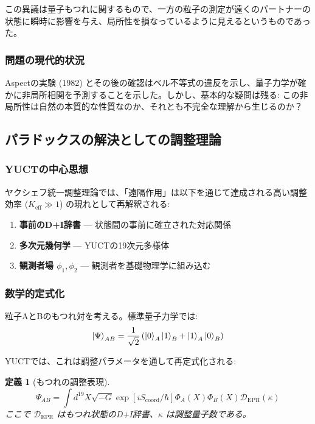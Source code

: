 \documentclass[11pt,a4paper]{article}
\newtheorem{definition}{定義}
\begin{document}
	この異議は量子もつれに関するもので、一方の粒子の測定が遠くのパートナーの状態に瞬時に影響を与え、局所性を損なっているように見えるというものであった。
	
	\subsubsection{問題の現代的状況}
	Aspectの実験 (1982) とその後の確認はベル不等式の違反を示し、量子力学が確かに非局所相関を予測することを示した。しかし、基本的な疑問は残る: この非局所性は自然の本質的な性質なのか、それとも不完全な理解から生じるのか？
	
	\subsection{パラドックスの解決としての調整理論}
	\label{subsec:yuct-solution}
	
	\subsubsection{YUCTの中心思想}
	ヤクシェフ統一調整理論では、「遠隔作用」は以下を通じて達成される高い調整効率 ($K_{\mathrm{eff}} \gg 1$) の現れとして再解釈される:
	
	\begin{enumerate}
		\item \textbf{事前のD+I辞書} — 状態間の事前に確立された対応関係
		\item \textbf{多次元幾何学} — YUCTの19次元多様体
		\item \textbf{観測者場 $\phi_1, \phi_2$} — 観測者を基礎物理学に組み込む
	\end{enumerate}
	
	\subsubsection{数学的定式化}
	粒子AとBのもつれ対を考える。標準量子力学では:
	\begin{equation}
		\ket{\Psi}_{AB} = \frac{1}{\sqrt{2}} \left( \ket{0}_A \ket{1}_B + \ket{1}_A \ket{0}_B \right)
	\end{equation}
	
	YUCTでは、これは調整パラメータを通して再定式化される:
	
	\begin{definition}[もつれの調整表現]
		\begin{equation}
			\Psi_{AB} = \int d^{19}X \sqrt{-G} \exp\left[i S_{\text{coord}}/\hbar\right] \Phi_A(X) \Phi_B(X) \mathcal{D}_{\text{EPR}}(\kappa)
		\end{equation}
		ここで $\mathcal{D}_{\text{EPR}}$ はもつれ状態のD+I辞書、$\kappa$ は調整量子数である。
	\end{definition}
	
\end{document}

